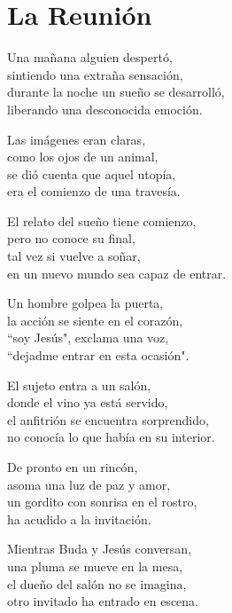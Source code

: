 \section*{La Reunión}
\label{LaReunion}

\vspace{1em}
\begin{center}
Una mañana alguien despertó,\\ 
sintiendo  una extraña sensación,\\ 
durante la noche un sueño se desarrolló,\\ 
liberando una desconocida emoción.

\vspace{1em} 
Las imágenes eran claras,\\ 
como los ojos de un animal,\\ 
se dió cuenta que aquel utopía,\\ 
era el comienzo de una travesía.

\vspace{1em} 
El relato del sueño tiene comienzo,\\ 
pero no conoce su final,\\ 
tal vez si vuelve a soñar,\\ 
en un nuevo mundo sea capaz de entrar.

\vspace{1em} 
Un hombre golpea la puerta,\\ 
la acción se siente en el corazón,\\ 
``soy Jesús", exclama una voz,\\ 
``dejadme entrar en esta ocasión".

\vspace{1em} 
El sujeto entra a un salón,\\ 
donde el vino ya está servido,\\ 
el anfitrión se encuentra sorprendido,\\ 
no conocía lo que había en su interior.

\vspace{1em} 
De pronto en un rincón,\\ 
asoma una luz de paz y amor,\\ 
un gordito con sonrisa en el rostro,\\ 
ha acudido a la invitación.

\vspace{1em} 
Mientras Buda y Jesús conversan,\\ 
una pluma se mueve en la mesa,\\ 
el dueño del salón no se imagina,\\ 
otro invitado ha entrado en escena.


\end{center}
